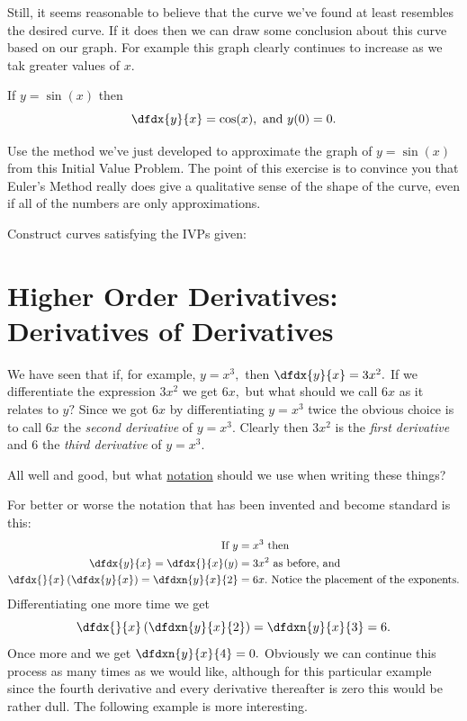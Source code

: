 Still, it seems reasonable to believe that the curve we've found at
least resembles the desired curve. If it does then we can draw some
conclusion about this curve based on our graph. For example this graph
clearly continues to increase as we tak greater values of $x.$

\begin{embeddedproblem}{}
  If $y=\sin(x)$ then
$$
\dfdx{y}{x}=\cos(x), \text{ and } y(0)=0.
$$

Use the method we've just developed to approximate the graph of
$y=\sin(x)$ from this Initial Value Problem. The point of this
exercise is to convince you that Euler's Method really does give a
qualitative sense of the shape of the curve, even if all of the
numbers are only approximations.
\end{embeddedproblem}

\begin{ProblemSection}
  \begin{myproblem}{}
    Construct curves satisfying the IVPs given:
  \end{myproblem}
\end{ProblemSection}
\section{Higher Order Derivatives: Derivatives of Derivatives}
\label{sec:high-order-deriv}

We have seen that if, for example, $y=x^3,$ then $\dfdx{y}{x} = 3x^2.$
If we differentiate the expression $3x^2$ we get $6x,$
but what should we call $6x$ as it relates to $y?$ Since we got $6x$
by differentiating $y=x^3$ twice the obvious choice is to call $6x$
the \emph{second derivative} of $y=x^3.$ Clearly then $3x^2$ is the
\emph{first derivative} and $6$ the \emph{third derivative} of
$y=x^3.$

All well and good, but what \underline{notation} should we use when
writing these things? 

For better or worse the notation that has been invented and become
standard is this:
\begin{align*}
  \text{ If } y &= x^3 \text{ then}\\
  \dfdx{y}{x}=\dfdx{}{x}(y) &= 3x^2 \text{ as before, and}\\
  \dfdx{}{x}\left(\dfdx{y}{x}\right)=\dfdxn{y}{x}{2} &= 6x. \text{
                                                       Notice the
                                                       placement of
                                                       the exponents.}\\
\end{align*}
Differentiating one more time we get
$$
  \dfdx{}{x}\left(\dfdxn{y}{x}{2}\right)=\dfdxn{y}{x}{3} = 6.
$$
Once more and we get $\dfdxn{y}{x}{4} = 0.$ Obviously we can continue
this process as many times as we would like, although for this
particular example since the fourth derivative and every derivative
thereafter is zero this would be rather dull. The following example is
more interesting.

